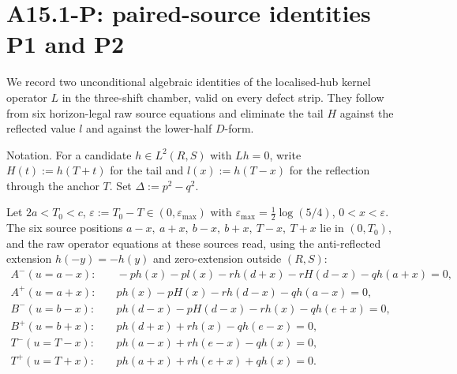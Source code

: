\section{A15.1-P: paired-source identities P1 and P2}
\label{sec:p12-P1P2}

We record two unconditional algebraic identities of the localised-hub
kernel operator $L$ in the three-shift chamber, valid on every
defect strip.  They follow from six horizon-legal raw source
equations and eliminate the tail $H$ against the reflected value $l$
and against the lower-half $D$-form.

Notation.  For a candidate $h \in L^{2}(R, S)$ with $L h = 0$,
write $H(t) := h(T + t)$ for the tail and $l(x) := h(T - x)$ for the
reflection through the anchor $T$.  Set $\Delta := p^{2} - q^{2}$.

\begin{lemma}
\label{lem:p12-P-six}
Let $2a < T_{0} < c$, $\varepsilon := T_{0} - T \in (0, \varepsilon_{\max})$
with $\varepsilon_{\max} = \tfrac12\log(5/4)$, $0 < x < \varepsilon$.
The six source positions
$a - x,\ a + x,\ b - x,\ b + x,\ T - x,\ T + x$
lie in $(0, T_{0})$, and the raw operator equations at these sources
read, using the anti-reflected extension $h(-y) = -h(y)$ and
zero-extension outside $(R, S)$:
\begin{align*}
A^{-}(u = a - x): & \quad -p h(x) - p l(x) - r h(d + x) - r H(d - x) - q h(a + x) = 0,\\
A^{+}(u = a + x): & \quad p h(x) - p H(x) - r h(d - x) - q h(a - x) = 0,\\
B^{-}(u = b - x): & \quad p h(d - x) - p H(d - x) - r h(x) - q h(e + x) = 0,\\
B^{+}(u = b + x): & \quad p h(d + x) + r h(x) - q h(e - x) = 0,\\
T^{-}(u = T - x): & \quad p h(a - x) + r h(e - x) - q h(x) = 0,\\
T^{+}(u = T + x): & \quad p h(a + x) + r h(e + x) + q h(x) = 0.
\end{align*}
\end{lemma}

